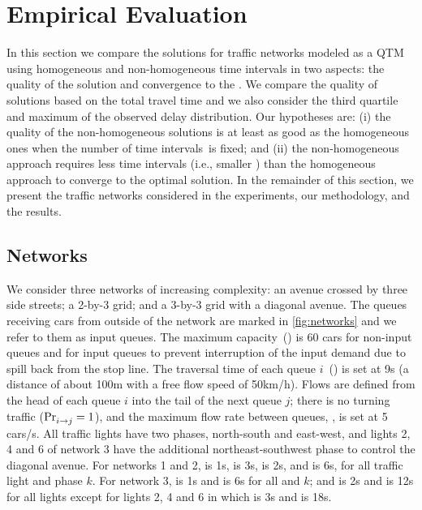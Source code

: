 \section{Empirical Evaluation}
  
In this section we compare the solutions for traffic networks modeled as a QTM
using homogeneous and non-homogeneous time intervals in two aspects:
%
the quality of the solution and convergence to the .
%
We compare the quality of solutions based on the total travel time and we also
consider the third quartile and maximum of the observed delay distribution.
%
%
%
Our hypotheses are:
%
(i) the quality of the non-homogeneous solutions is at least as good as the
homogeneous ones when the number of time intervals~\Nn is fixed; and 
%
(ii) the non-homogeneous approach requires less time intervals (i.e., smaller
\Nn) than the homogeneous approach to converge to the optimal solution.
%
In the remainder of this section, we present the traffic networks considered in
the experiments, our methodology, and the results.



\subsection{Networks}

We consider three networks of increasing complexity: an avenue crossed by three
side streets; a 2-by-3 grid; and a 3-by-3 grid with a diagonal avenue.
%
The queues receiving cars from outside of the network are marked in
\cref{fig:networks} and we refer to them as input queues.
%
The maximum capacity~() is 60 cars for non-input queues and
 for input queues to prevent interruption of the input demand
due to spill back from the stop line. 
%
The traversal time of each queue $i$~() is set at 9s (a distance of
about 100m with a free flow speed of 50km/h).
%
Flows are defined from the head of each queue $i$ into the tail of the next
queue $j$;
%
there is no turning traffic ($\mathrm{Pr}_{i\to j}^{\mathrm{}}=1$), and the maximum flow rate
between queues, , is set at 5 cars/s.
%
All traffic lights have two phases, north-south and east-west, and lights 2, 4
and 6 of network 3 have the additional northeast-southwest phase to control the
diagonal avenue.
%
For networks 1 and 2,  is 1s,  is 3s, \CTMIN{\tl} is
2s, and \CTMAX{\tl} is 6s, for all traffic light \tl and phase $k$.
%
For network 3,  is 1s and  is 6s for all \tl and
$k$; and \CTMIN{\tl} is 2s and \CTMAX{\tl} is 12s for all lights \tl except for
lights 2, 4 and 6 in which \CTMIN{\tl} is 3s and \CTMAX{\tl} is 18s.




